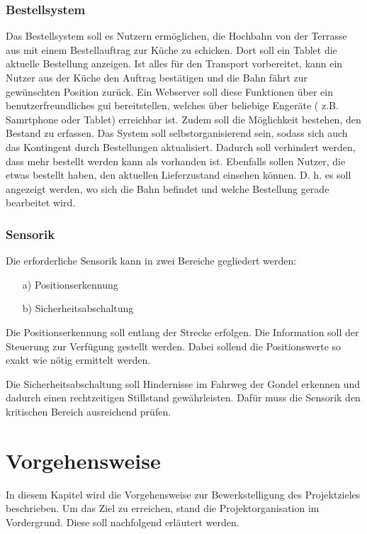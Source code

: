\subsection{Bestellsystem}


Das Bestellsystem soll es Nutzern ermöglichen, die Hochbahn von der Terrasse aus mit einem Bestellauftrag zur Küche zu schicken. 
Dort soll ein Tablet die aktuelle Bestellung anzeigen. Ist alles für den Transport vorbereitet, kann ein Nutzer aus der Küche den Auftrag 
bestätigen und die Bahn fährt zur gewünschten Position zurück. Ein Webserver soll diese Funktionen über ein benutzerfreundliches \acrfull{gui} bereitstellen, welches über beliebige Engeräte ( z.B. Samrtphone oder Tablet) erreichbar ist.
Zudem soll die Möglichkeit bestehen, den Bestand zu erfassen. Das System soll selbstorganisierend sein, sodass sich auch das Kontingent durch Bestellungen aktualisiert. Dadurch soll verhindert werden, dass mehr bestellt werden kann als vorhanden ist.
Ebenfalls sollen Nutzer, die etwas bestellt haben, den aktuellen Lieferzustand einsehen können. D. h. es soll angezeigt werden, wo sich die Bahn befindet und welche Bestellung gerade bearbeitet wird.



\subsection{Sensorik}
Die erforderliche Sensorik kann in zwei Bereiche gegliedert werden: 

\begin{itemize}
	\item [a)] Positionserkennung 
	\item [b)] Sicherheitsabschaltung 
	
\end{itemize}

Die Positionserkennung soll entlang der Strecke erfolgen. Die Information soll der Steuerung zur Verfügung gestellt werden. Dabei sollend die Positionswerte so exakt wie nötig ermittelt werden.

Die Sicherheitsabschaltung soll Hindernisse im Fahrweg der Gondel erkennen und dadurch einen rechtzeitigen Stillstand gewährleisten. Dafür muss die Sensorik den kritischen Bereich ausreichend prüfen. 



\chapter{Vorgehensweise}
\label{vorgehensweise}
In diesem Kapitel wird die Vorgehensweise zur Bewerkstelligung des Projektzieles beschrieben. Um das Ziel zu erreichen, stand die Projektorganisation im Vordergrund. Diese soll nachfolgend erläutert werden. 

